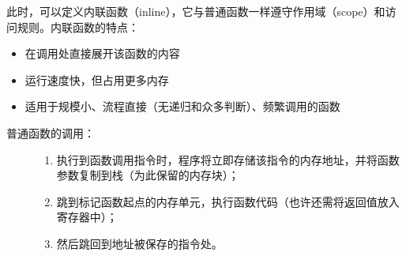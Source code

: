 \documentclass[letterpaper,10pt,english]{sphinxmanual}
\begin{document}
此时，可以定义内联函数（inline），它与普通函数一样遵守作用域（scope）和访问规则。内联函数的特点：
\begin{itemize}
\item {} 
在调用处直接展开该函数的内容

\item {} 
运行速度快，但占用更多内存

\item {} 
适用于规模小、流程直接（无递归和众多判断）、频繁调用的函数

\end{itemize}
\begin{description}
\item[{普通函数的调用：}] \leavevmode\begin{enumerate}
\item {} 
执行到函数调用指令时，程序将立即存储该指令的内存地址，并将函数参数复制到栈（为此保留的内存块）；

\item {} 
跳到标记函数起点的内存单元，执行函数代码（也许还需将返回值放入寄存器中）；

\item {} 
然后跳回到地址被保存的指令处。

\end{enumerate}

\end{description}
\end{document}
